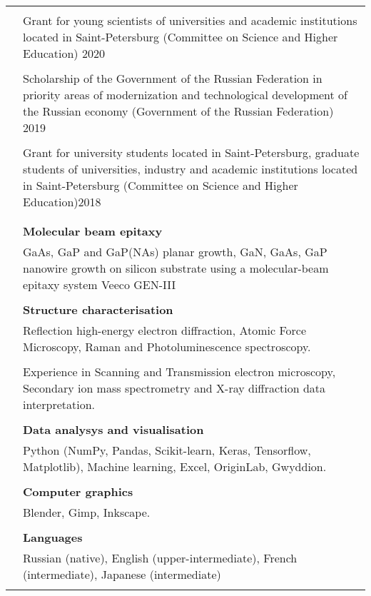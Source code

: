 \documentclass[letterpaper, 11pt]{article}
\begin{document}
\begin{longtable}{p{1.3in}p{4.8in}}
		{\color{OliveGreen}{Honors and scholarships}} \\
        & Grant for young scientists of universities and academic institutions
        located in Saint-Petersburg (Committee on Science and Higher Education)
        \hfill 2020\\
		& \\
        & Scholarship of the Government of the Russian Federation in priority
        areas of modernization and technological development of the Russian
        economy (Government of the Russian Federation) \hfill 2019\\
		& \\
        & Grant for university students located in Saint-Petersburg, graduate
        students of universities, industry and academic institutions located in
        Saint-Petersburg (Committee on Science and Higher Education)\hfill 2018
        \\
		& \\
		
		
		{\color{OliveGreen}{Skills}} \\
		& \textbf{Molecular beam epitaxy} \\
        & GaAs, GaP and GaP(NAs) planar growth, GaN, GaAs, GaP nanowire growth
        on silicon substrate using a molecular-beam epitaxy system Veeco
        GEN-III \\
		& \\
		& \textbf{Structure characterisation} \\
        & Reflection high-energy electron diffraction, Atomic Force Microscopy,
        Raman and Photoluminescence spectroscopy. \\
		& \\
        & Experience in Scanning and Transmission electron microscopy,
        Secondary ion mass spectrometry and X-ray  diffraction data
        interpretation. \\
		& \\
		& \textbf{Data analysys and visualisation} \\
        & Python (NumPy, Pandas, Scikit-learn, Keras, Tensorflow,
        Matplotlib), Machine learning, Excel, OriginLab, Gwyddion. \\
        \\
		& \textbf{Computer graphics} \\
        & Blender, Gimp, Inkscape. \\ 
		& \\
		& \textbf{Languages} \\
        & Russian (native), English (upper-intermediate), French
        (intermediate), Japanese (intermediate) \\
		& \\
		

\end{longtable}
\end{document}
